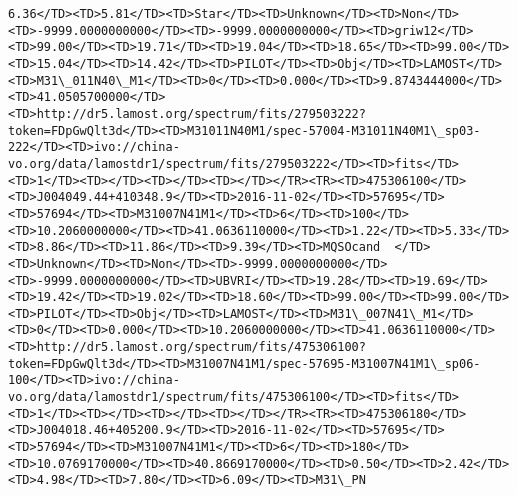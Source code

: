 \documentclass[11pt]{article}
\begin{document}
\begin{Verbatim}[commandchars=\\\{\}]
6.36</TD><TD>5.81</TD><TD>Star</TD><TD>Unknown</TD><TD>Non</TD><TD>-9999.0000000000</TD><TD>-9999.0000000000</TD><TD>griw12</TD><TD>99.00</TD><TD>19.71</TD><TD>19.04</TD><TD>18.65</TD><TD>99.00</TD><TD>15.04</TD><TD>14.42</TD><TD>PILOT</TD><TD>Obj</TD><TD>LAMOST</TD><TD>M31\_011N40\_M1</TD><TD>0</TD><TD>0.000</TD><TD>9.8743444000</TD><TD>41.0505700000</TD><TD>http://dr5.lamost.org/spectrum/fits/279503222?token=FDpGwQlt3d</TD><TD>M31011N40M1/spec-57004-M31011N40M1\_sp03-222</TD><TD>ivo://china-vo.org/data/lamostdr1/spectrum/fits/279503222</TD><TD>fits</TD><TD>1</TD><TD></TD><TD></TD><TD></TD></TR><TR><TD>475306100</TD><TD>J004049.44+410348.9</TD><TD>2016-11-02</TD><TD>57695</TD><TD>57694</TD><TD>M31007N41M1</TD><TD>6</TD><TD>100</TD><TD>10.2060000000</TD><TD>41.0636110000</TD><TD>1.22</TD><TD>5.33</TD><TD>8.86</TD><TD>11.86</TD><TD>9.39</TD><TD>MQSOcand  </TD><TD>Unknown</TD><TD>Non</TD><TD>-9999.0000000000</TD><TD>-9999.0000000000</TD><TD>UBVRI</TD><TD>19.28</TD><TD>19.69</TD><TD>19.42</TD><TD>19.02</TD><TD>18.60</TD><TD>99.00</TD><TD>99.00</TD><TD>PILOT</TD><TD>Obj</TD><TD>LAMOST</TD><TD>M31\_007N41\_M1</TD><TD>0</TD><TD>0.000</TD><TD>10.2060000000</TD><TD>41.0636110000</TD><TD>http://dr5.lamost.org/spectrum/fits/475306100?token=FDpGwQlt3d</TD><TD>M31007N41M1/spec-57695-M31007N41M1\_sp06-100</TD><TD>ivo://china-vo.org/data/lamostdr1/spectrum/fits/475306100</TD><TD>fits</TD><TD>1</TD><TD></TD><TD></TD><TD></TD></TR><TR><TD>475306180</TD><TD>J004018.46+405200.9</TD><TD>2016-11-02</TD><TD>57695</TD><TD>57694</TD><TD>M31007N41M1</TD><TD>6</TD><TD>180</TD><TD>10.0769170000</TD><TD>40.8669170000</TD><TD>0.50</TD><TD>2.42</TD><TD>4.98</TD><TD>7.80</TD><TD>6.09</TD><TD>M31\_PN    
\end{Verbatim}
\end{document}
